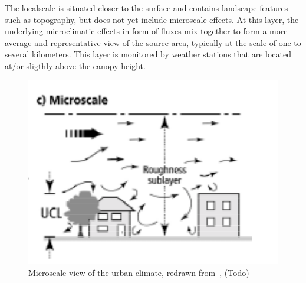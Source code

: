The localscale is situated closer to the surface and contains landscape features such as topography, but does not yet include microscale effects. At this layer, the underlying microclimatic effects in form of fluxes mix together to form a more average and representative view of the source area, typically at the scale of one to several kilometers. This layer is monitored by weather stations that are located at/or sligthly above the canopy height.

\begin{figure}[h]
    \centering
    \includegraphics[width=\textwidth]{images/microscale boundary layer.png}
    \caption{Microscale view of the urban climate, redrawn from~\cite{oke2006guideline}, (Todo)}
    \label{fig:microscale boundary layer}
\end{figure}


